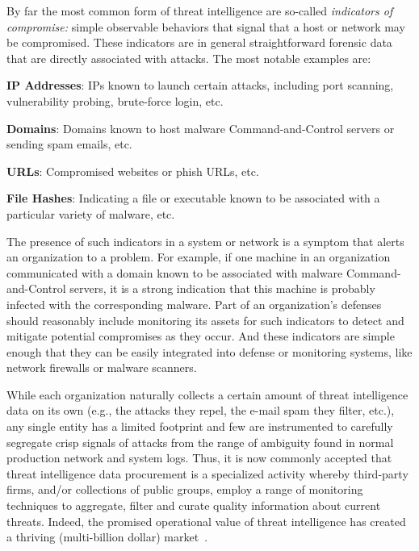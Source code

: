 By far the most common form of threat intelligence are so-called 
\emph{indicators of compromise:} simple observable behaviors that 
signal that a host or network may be compromised. These indicators 
are in general straightforward forensic data that are directly 
associated with attacks. The most notable examples are:
\begin{prettylist}
    \item \textbf{IP Addresses}: IPs known to launch certain 
    attacks, including port scanning, vulnerability probing, brute-force login, etc.
    \item \textbf{Domains}: Domains known to host 
    malware Command-and-Control servers or sending spam emails, etc.
    \item \textbf{URLs}: Compromised websites or phish URLs, etc.
    \item \textbf{File Hashes}: Indicating a file or executable 
    known to be associated with a particular variety of malware, etc.
\end{prettylist}

The presence of such indicators in a system or network is a symptom 
that alerts an organization to a problem. For example, if one 
machine in an organization communicated with a domain known to be
associated with malware Command-and-Control servers, it is a strong
indication that this machine is probably infected with the 
corresponding malware. Part of an organization's defenses 
should reasonably include monitoring its assets
for such indicators to detect and mitigate potential compromises as
they occur. And these indicators are simple enough that they can be
easily integrated into defense or monitoring systems, like network
firewalls or malware scanners.

While each organization naturally collects a certain amount of threat
intelligence data on its own (e.g., the attacks they repel, the e-mail
spam they filter, etc.), any single entity has a limited footprint and
few are instrumented to carefully segregate crisp signals of attacks
from the range of ambiguity found in normal production network and
system logs. Thus, it is now commonly accepted that threat
intelligence data procurement is a specialized activity whereby
third-party firms, and/or collections of public groups, employ a range
of monitoring techniques to aggregate, filter and curate quality
information about current threats.  Indeed, the promised operational
value of threat intelligence has created a thriving (multi-billion
dollar) market~\cite{timarket}. 

